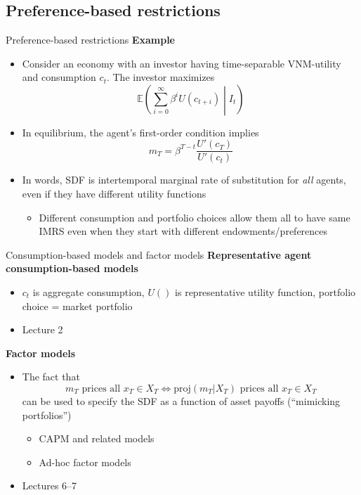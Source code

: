 \documentclass[xcolor=table, aspectratio=169]{beamer}
\begin{document}
\subsection{Preference-based restrictions}

\begin{frame}{Preference-based restrictions}
\textbf{Example}
\begin{itemize}
\item Consider an economy with an investor having time-separable VNM-utility and consumption $c_t$. The investor maximizes
$$\mathbb{E} \left( \sum_{i=0}^\infty \beta^i U \left(c_{t+i} \right) \middle\vert I_t \right)$$
\item In equilibrium, the agent's first-order condition implies
$$m_T = \beta^{T-t} \frac{U'(c_T)}{U'(c_t)}$$
\item In words, SDF is intertemporal marginal rate of substitution for \textit{all} agents, even if they have different utility functions
\begin{itemize}
\item Different consumption and portfolio choices allow them all to have same IMRS even when they start with different endowments/preferences
\end{itemize}
\end{itemize}
\end{frame}

\begin{frame}{Consumption-based models and factor models}
\textbf{Representative agent consumption-based models}
\begin{itemize}
\item $c_t$ is aggregate consumption, $U()$ is representative utility function, portfolio choice = market portfolio
\item Lecture 2
\end{itemize}
\textbf{Factor models}
\begin{itemize}
\item The fact that 
$$m_T \text{ prices all } x_T \in X_T \iff \text{proj}(m_T \vert X_T) \text{ prices all } x_T \in X_T$$
can be used to specify the SDF as a function of asset payoffs (``mimicking portfolios'')
\begin{itemize}
\item CAPM and related models
\item Ad-hoc factor models
\end{itemize}
\item Lectures 6--7
\end{itemize}
\end{frame}
\end{document}
